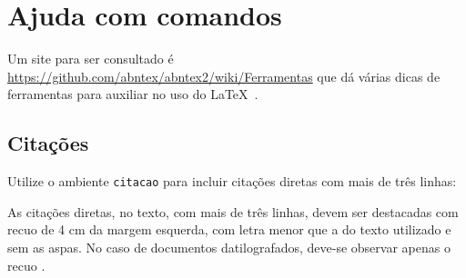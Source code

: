  
% 
% 
% 
 
 
\chapter{Ajuda com comandos}\label{cap_ajuda}


\vspace{10pt}
Um site para ser consultado é \url{https://github.com/abntex/abntex2/wiki/Ferramentas} que dá várias dicas de ferramentas para auxiliar no uso do \LaTeX~. 

\section{Citações}

Utilize o ambiente \texttt{citacao} para incluir citações diretas com mais de três linhas:

\begin{citacao}
As citações diretas, no texto, com mais de três linhas, devem ser
destacadas com recuo de 4 cm da margem esquerda, com letra menor que a do texto
utilizado e sem as aspas. No caso de documentos datilografados, deve-se
observar apenas o recuo \cite[5.3]{NBR10520:2002}.
\end{citacao}


